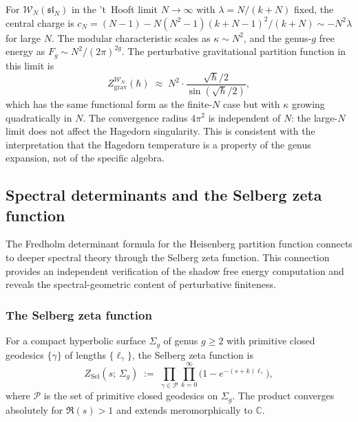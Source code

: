 \begin{remark}
For $\mathcal{W}_N(\mathfrak{sl}_N)$ in the 't~Hooft limit $N \to \infty$ with $\lambda = N/(k+N)$ fixed, the central charge is $c_N = (N-1) - N(N^2-1)(k+N-1)^2/(k+N) \sim -N^2\lambda$ for large $N$. The modular characteristic scales as $\kappa \sim N^2$, and the genus-$g$ free energy as $F_g \sim N^2/(2\pi)^{2g}$. The perturbative gravitational partition function in this limit is
\[
Z_{\mathrm{grav}}^{\mathcal{W}_N}(\hbar) \;\approx\; N^2 \cdot \frac{\sqrt{\hbar}/2}{\sin(\sqrt{\hbar}/2)},
\]
which has the same functional form as the finite-$N$ case but with $\kappa$ growing quadratically in $N$. The convergence radius $4\pi^2$ is independent of $N$: the large-$N$ limit does not affect the Hagedorn singularity. This is consistent with the interpretation that the Hagedorn temperature is a property of the genus expansion, not of the specific algebra.
\end{remark}



\subsection{Spectral determinants and the Selberg zeta function}

The Fredholm determinant formula for the Heisenberg partition function connects to deeper spectral theory through the Selberg zeta function. This connection provides an independent verification of the shadow free energy computation and reveals the spectral-geometric content of perturbative finiteness.

\subsubsection{The Selberg zeta function}

\begin{definition}
For a compact hyperbolic surface $\Sigma_g$ of genus $g \geq 2$ with primitive closed geodesics $\{\gamma\}$ of lengths $\{\ell_\gamma\}$, the Selberg zeta function is
\begin{equation}%
Z_{\mathrm{Sel}}(s;\,\Sigma_g) \;:=\; \prod_{\gamma \in \mathcal{P}} \prod_{k=0}^{\infty} \bigl(1 - e^{-(s+k)\ell_\gamma}\bigr),
\end{equation}
where $\mathcal{P}$ is the set of primitive closed geodesics on $\Sigma_g$. The product converges absolutely for $\Re(s) > 1$ and extends meromorphically to $\mathbb{C}$.
\end{definition}

